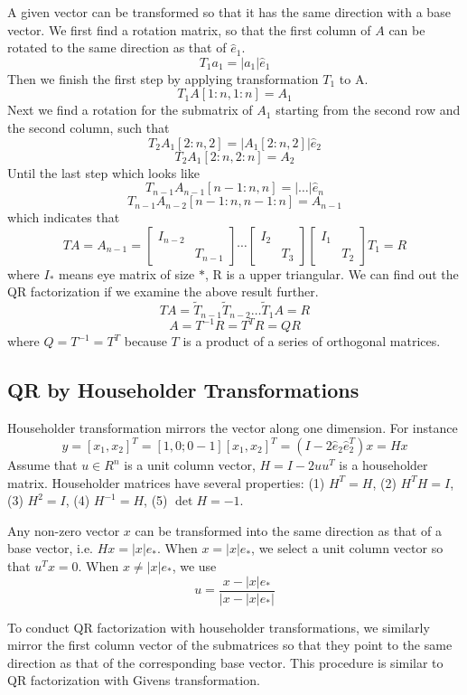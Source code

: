 A given vector can be transformed so that it has the same direction with
a base vector. We first find a rotation matrix, so that the first column of $A$
can be rotated to the same direction as that of $\hat{e}_1$.
$$ T_1 a_1 = |a_1| \hat{e}_1$$
Then we finish the first step by applying transformation $T_1$ to A.
$$ T_1 A[1:n,1:n] = A_1 $$
Next we find a rotation for the submatrix of $A_1$ starting from the second
row and the second column, such that
$$ T_2 A_1[2:n,2] = |A_1[2:n,2]| \hat{e}_2$$
$$T_2 A_1[2:n,2:n] = A_2$$
Until the last step which looks like
$$ T_{n-1} A_{n-1}[n-1:n,n] = |\ldots|\hat{e}_n$$
$$ T_{n-1} A_{n-2}[n-1:n,n-1:n] = A_{n-1} $$
which indicates that
$$
TA = A_{n-1} = \begin{bmatrix} I_{n-2} & \\ & T_{n-1} \end{bmatrix}
	\cdots \begin{bmatrix} I_2 & \\ & T_3 \end{bmatrix}
		\begin{bmatrix} I_1 & \\ & T_2 \end{bmatrix}
			T_1 = R
$$
where $I_\ast$ means eye matrix of size $\ast$, R is a upper triangular.
We can find out the QR factorization if we examine the above result further.
$$ TA = \tilde{T}_{n-1} \tilde{T}_{n-2} \ldots \tilde{T}_1 A = R$$
$$ A = T^{-1}R = T^T R = QR $$
where $Q = T^{-1} = T^T$ because $T$ is a product of a series of orthogonal
matrices.

\subsection{QR by Householder Transformations}

Householder transformation mirrors the vector along one dimension. For instance
$$
y = [x_1, x_2]^T = [1, 0; 0 -1][x_1, x_2]^T = (I-2\hat{e}_2\hat{e}_2^T)x = Hx
$$
Assume that $u\in R^n$ is a unit column vector, $H=I-2uu^T$ is a householder matrix.
Householder matrices have several properties: (1) $H^T=H$, (2) $H^TH=I$,
(3) $H^2=I$, (4) $H^{-1}=H$, (5) $\det H = -1$.

Any non-zero vector $x$ can be transformed into the same direction as that of
a base vector, i.e. $Hx = |x|e_\ast$. When $x=|x|e_\ast$, we select a unit column
vector so that $u^Tx=0$. When $x\ne |x|e_\ast$, we use
$$ u = \frac{x-|x|e_\ast}{|x-|x|e_\ast|} $$

To conduct QR factorization with householder transformations, we similarly
mirror the first column vector of the submatrices so that they point to the
same direction as that of the corresponding base vector. This procedure is similar
to QR factorization with Givens transformation.
